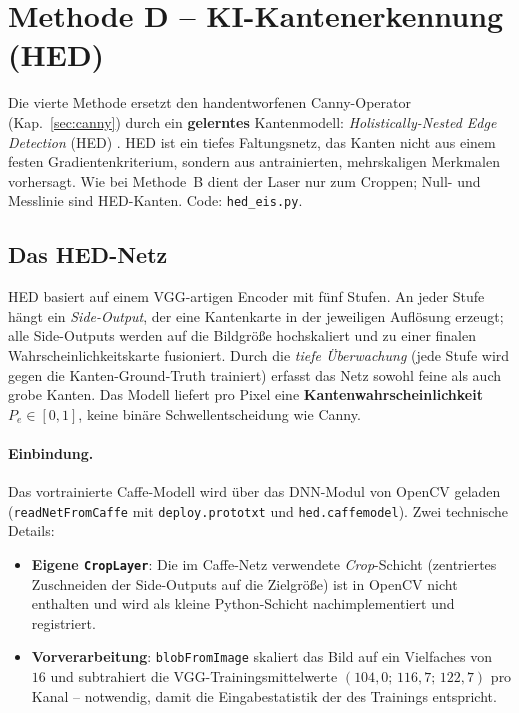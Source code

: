 
\section{Methode D -- KI-Kantenerkennung (HED)}
\label{sec:hed}

Die vierte Methode ersetzt den handentworfenen Canny-Operator
(Kap.~\ref{sec:canny}) durch ein \textbf{gelerntes} Kantenmodell:
\emph{Holistically-Nested Edge Detection} (HED) \citep{xie2015hed}. HED ist ein
tiefes Faltungsnetz, das Kanten nicht aus einem festen Gradientenkriterium,
sondern aus antrainierten, mehrskaligen Merkmalen vorhersagt. Wie bei Methode~B
dient der Laser nur zum Croppen; Null- und Messlinie sind HED-Kanten.
Code: \texttt{hed\_eis.py}.

\subsection{Das HED-Netz}
\label{sec:hed_netz}

HED \citep{xie2015hed} basiert auf einem VGG-artigen Encoder mit fünf Stufen. An
jeder Stufe hängt ein \emph{Side-Output}, der eine Kantenkarte in der jeweiligen
Auflösung erzeugt; alle Side-Outputs werden auf die Bildgröße hochskaliert und zu
einer finalen Wahrscheinlichkeitskarte fusioniert. Durch die \emph{tiefe
Überwachung} (jede Stufe wird gegen die Kanten-Ground-Truth trainiert) erfasst
das Netz sowohl feine als auch grobe Kanten. Das Modell liefert pro Pixel eine
\textbf{Kantenwahrscheinlichkeit} $P_e \in [0,1]$, keine binäre Schwellentscheidung
wie Canny.

\paragraph{Einbindung.}
Das vortrainierte Caffe-Modell \citep{jia2014caffe} wird über das DNN-Modul von
OpenCV \citep{bradski2000} geladen (\texttt{readNetFromCaffe} mit
\texttt{deploy.prototxt} und \texttt{hed.caffemodel}). Zwei technische Details:
\begin{itemize}
  \item \textbf{Eigene \texttt{CropLayer}}: Die im Caffe-Netz verwendete
        \emph{Crop}-Schicht (zentriertes Zuschneiden der Side-Outputs auf die
        Zielgröße) ist in OpenCV nicht enthalten und wird als kleine
        Python-Schicht nachimplementiert und registriert.
  \item \textbf{Vorverarbeitung}: \texttt{blobFromImage} skaliert das Bild auf ein
        Vielfaches von~$16$ und subtrahiert die VGG-Trainingsmittelwerte
        $(104{,}0;\,116{,}7;\,122{,}7)$ pro Kanal -- notwendig, damit die
        Eingabestatistik der des Trainings entspricht.
\end{itemize}

